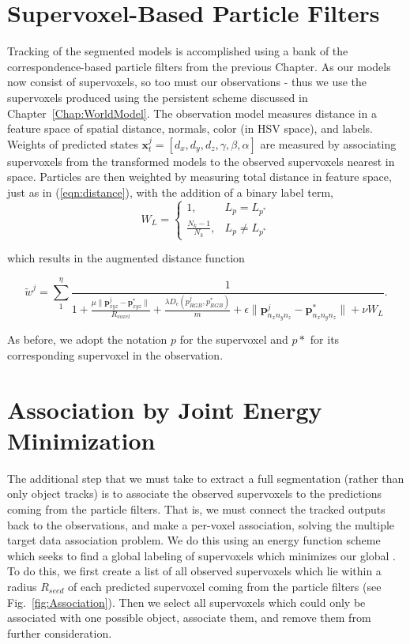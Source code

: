 \section{Supervoxel-Based Particle Filters}
Tracking of the segmented models is accomplished using a bank of the correspondence-based particle filters from the previous Chapter. As our models now consist of supervoxels, so too must our observations - thus we use the supervoxels produced using the persistent scheme discussed in Chapter~\ref{Chap:WorldModel}. The observation model measures distance in a feature space of spatial distance, normals, color (in HSV space), and labels. Weights of predicted states $\mathbf{x}^j_t = [d_x, d_y, d_z, \gamma, \beta, \alpha]$ are measured by associating supervoxels from the transformed models to the observed supervoxels nearest in space. Particles are then weighted by measuring total distance in feature space, just as in (\ref{eqn:distance}), with the addition of a binary label term,
\begin{equation}
  \label{eqn:dist_labels}
    W_L =  \begin{cases} 1, & L_p = L_{p^*} \\ 
                         \frac{N_k-1}{N_k}, & L_p \neq L_{p^*} 
           \end{cases} 
\end{equation}

which results in the augmented distance function

\begin{equation} \label{eqn:augmented_distance}
  \tilde{w}^j = \sum_{1}^{\eta} \frac{1}{1 + \frac {\mu \lVert \mathbf{p}^j_{xyz} - \mathbf{p}^*_{xyz} \rVert} {R_{voxel}} +  \frac{\lambda D_c(p^j_{RGB},p^*_{RGB})}{m} +   \epsilon \lVert \mathbf{p}^j_{n_x n_y n_z} - \mathbf{p}^*_{n_x n_y n_z} \rVert + \nu  W_L}.
\end{equation}

As before, we adopt the notation $p$ for the supervoxel and $p*$ for its corresponding supervoxel in the observation.

\section{Association by Joint Energy Minimization}
The additional step that we must take to extract a full segmentation (rather than only object tracks) is to associate the observed supervoxels to the predictions coming from the particle filters. That is, we must connect the tracked outputs back to the observations, and make a per-voxel association, solving the multiple target data association problem. We do this using an energy function scheme which seeks to find a global labeling of supervoxels which minimizes our global  . To do this, we first create a list of all observed supervoxels which lie within a radius $R_{seed}$ of each predicted supervoxel coming from the particle filters (see Fig.~\ref{fig:Association}). Then we select all supervoxels which could only be associated with one possible object, associate them, and remove them from further consideration.

